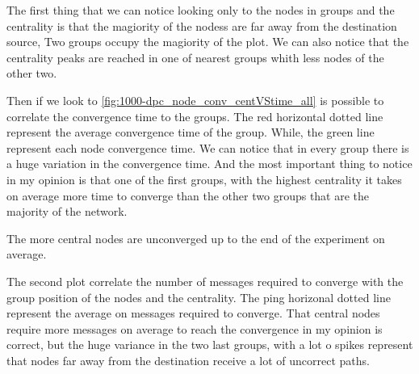 \documentclass[10pt,conference,letterpaper]{IEEEtran}
\begin{document}
The first thing that we can notice looking only to the nodes in groups and the centrality
is that the magiority of the nodess are far away from the destination source,
Two groups occupy the magiority of the plot.
We can also notice that the centrality peaks are reached in one of nearest groups
whith less nodes of the other two.

Then if we look to \cref{fig:1000-dpc_node_conv_centVStime_all} is possible to
correlate the convergence time to the groups.
The red horizontal dotted line represent the average convergence time of the group.
While, the green line represent each node convergence time.
We can notice that in every group there is a huge variation in the convergence time.
And the most important thing to notice in my opinion is that one of the first
groups, with the highest centrality it takes on average more time to converge than
the other two groups that are the majority of the network.

The more central nodes are unconverged up to the end of the experiment on average.

The second plot  correlate the number
of messages required to converge with the group position of the nodes and the centrality.
The ping horizonal dotted line represent the average on messages required to converge.
That central nodes require more messages on average to reach the convergence in my
opinion is correct, but the huge variance in the two last groups, with a lot o spikes
represent that nodes far away from the destination receive a lot of uncorrect
paths.
\end{document}
